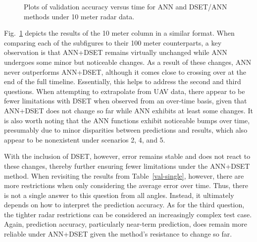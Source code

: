 \documentclass[12pt]{uthesis-v12}  %
\begin{document}
\begin{figure}
	\hfill	
{}
						
\caption{Plots of validation accuracy versus time for ANN and DSET/ANN methods under 10 meter radar data.}
	\label{10-one}
	\end{figure}	
	
Fig.~\ref{10-one} depicts the results of the 10 meter column in a similar format. When comparing each of the subfigures to their 100 meter counterparts, a key observation is that ANN+DSET remains virtually unchanged while ANN undergoes some minor but noticeable changes. As a result of these changes, ANN never outperforms ANN+DSET, although it comes close to crossing over at the end of the full timeline. Essentially, this helps to address the second and third questions. When attempting to extrapolate from UAV data, there appear to be fewer limitations with DSET when observed from an over-time basis, given that ANN+DSET does not change so far while ANN exhibits at least some changes. It is also worth noting that the ANN functions exhibit noticeable bumps over time, presumably due to minor disparities between predictions and results, which also appear to be nonexistent under scenarios 2, 4, and 5. 

With the inclusion of DSET, however, error remains stable and does not react to these changes, thereby further ensuring fewer limitations under the ANN+DSET method. When revisiting the results from Table~\ref{val-single}, however, there are more restrictions when only considering the average error over time. Thus, there is not a single answer to this question from all angles. Instead, it ultimately depends on how to interpret the prediction accuracy. As for the third question, the tighter radar restrictions can be considered an increasingly complex test case. Again, prediction accuracy, particularly near-term prediction, does remain more reliable under ANN+DSET given the method's resistance to change so far. 
	
\end{document}

